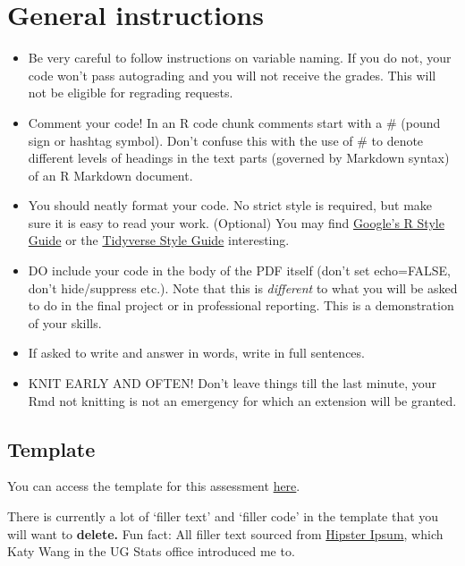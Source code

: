 \documentclass[
  openany]{book}
\begin{document}
\hypertarget{general-instructions}{%
\section{General instructions}\label{general-instructions}}

\begin{itemize}
\item
  Be very careful to follow instructions on variable naming. If you do not, your code won't pass autograding and you will not receive the grades. This will not be eligible for regrading requests.
\item
  Comment your code! In an R code chunk comments start with a \# (pound sign or hashtag symbol). Don't confuse this with the use of \# to denote different levels of headings in the text parts (governed by Markdown syntax) of an R Markdown document.
\item
  You should neatly format your code. No strict style is required, but make sure it is easy to read your work. (Optional) You may find \href{https://google.github.io/styleguide/Rguide.html\#:~:text=R\%20is\%20a\%20high\%2Dlevel,Guide\%20by\%20Hadley\%20Wickham\%20license.}{Google's R Style Guide} or the \href{https://style.tidyverse.org/}{Tidyverse Style Guide} interesting.
\item
  DO include your code in the body of the PDF itself (don't set echo=FALSE, don't hide/suppress etc.). Note that this is \emph{different} to what you will be asked to do in the final project or in professional reporting. This is a demonstration of your skills.
\item
  If asked to write and answer in words, write in full sentences.
\item
  KNIT EARLY AND OFTEN! Don't leave things till the last minute, your Rmd not knitting is not an emergency for which an extension will be granted.
\end{itemize}

\hypertarget{template}{%
\subsection{Template}\label{template}}

You can access the template for this assessment \href{https://jupyter.utoronto.ca/hub/user-redirect/git-pull?repo=https\%3A\%2F\%2Fgithub.com\%2Fsta303-bolton\%2Fsta303-w22-mini-portfolio\&urlpath=rstudio\%2F\&branch=master}{here}.

There is currently a lot of `filler text' and `filler code' in the template that you will want to \textbf{delete.} Fun fact: All filler text sourced from \href{https://hipsum.co/}{Hipster Ipsum}, which Katy Wang in the UG Stats office introduced me to.
\end{document}
